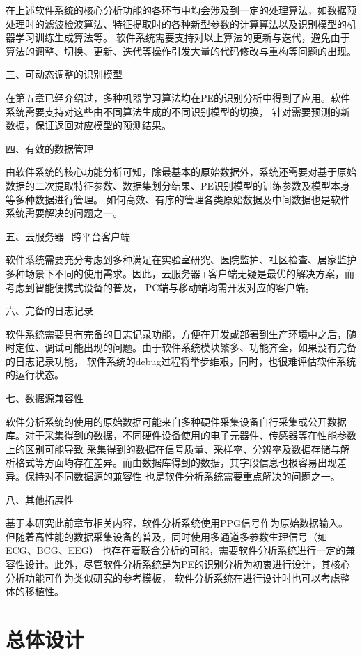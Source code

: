 在上述软件系统的核心分析功能的各环节中均会涉及到一定的处理算法，如数据预处理时的滤波检波算法、特征提取时的各种新型参数的计算算法以及识别模型的机器学习训练生成算法等。
软件系统需要支持对以上算法的更新与迭代，避免由于算法的调整、切换、更新、迭代等操作引发大量的代码修改与重构等问题的出现。

三、可动态调整的识别模型

在第五章已经介绍过，多种机器学习算法均在PE的识别分析中得到了应用。软件系统需要支持对这些由不同算法生成的不同识别模型的切换，
针对需要预测的新数据，保证返回对应模型的预测结果。

四、有效的数据管理

由软件系统的核心功能分析可知，除最基本的原始数据外，系统还需要对基于原始数据的二次提取特征参数、数据集划分结果、PE识别模型的训练参数及模型本身等多种数据进行管理。
如何高效、有序的管理各类原始数据及中间数据也是软件系统需要解决的问题之一。

五、云服务器+跨平台客户端

软件系统需要充分考虑到多种满足在实验室研究、医院监护、社区检查、居家监护多种场景下不同的使用需求。因此，云服务器+客户端无疑是最优的解决方案，而考虑到智能便携式设备的普及，
PC端与移动端均需开发对应的客户端。

六、完备的日志记录

软件系统需要具有完备的日志记录功能，方便在开发或部署到生产环境中之后，随时定位、调试可能出现的问题。由于软件系统模块繁多、功能齐全，如果没有完备的日志记录功能，
软件系统的debug过程将举步维艰，同时，也很难评估软件系统的运行状态。

七、数据源兼容性

软件分析系统的使用的原始数据可能来自多种硬件采集设备自行采集或公开数据库。对于采集得到的数据，不同硬件设备使用的电子元器件、传感器等在性能参数上的区别可能导致
采集得到的数据在信号质量、采样率、分辨率及数据存储与解析格式等方面均存在差异。而由数据库得到的数据，其字段信息也极容易出现差异。保持对不同数据源的兼容性
也是软件分析系统需要重点解决的问题之一。

八、其他拓展性

基于本研究此前章节相关内容，软件分析系统使用PPG信号作为原始数据输入。但随着高性能的数据采集设备的普及，同时使用多通道多参数生理信号（如ECG、BCG、EEG）
也存在着联合分析的可能，需要软件分析系统进行一定的兼容性设计。此外，尽管软件分析系统是为PE的识别分析为初衷进行设计，其核心分析功能可作为类似研究的参考模板，
软件分析系统在进行设计时也可以考虑整体的移植性。

\section{总体设计}

